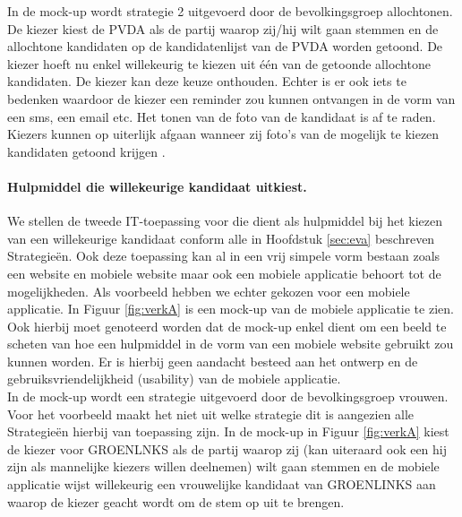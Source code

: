 In de mock-up wordt strategie 2 uitgevoerd door de bevolkingsgroep allochtonen. De kiezer kiest de PVDA als de partij waarop zij/hij wilt gaan stemmen en de allochtone kandidaten op de kandidatenlijst van de PVDA worden getoond. De kiezer hoeft nu enkel willekeurig te kiezen uit één van de getoonde allochtone kandidaten. De kiezer kan deze keuze onthouden. Echter is er ook iets te bedenken waardoor de kiezer een reminder zou kunnen ontvangen in de vorm van een sms, een email etc. Het tonen van de foto van de kandidaat is af te raden. Kiezers kunnen op uiterlijk afgaan wanneer zij foto's van de mogelijk te kiezen kandidaten getoond krijgen \citep{banducci2008ballot,lawson2010looking}. 


\paragraph{Hulpmiddel die willekeurige kandidaat uitkiest.}
We stellen de tweede IT-toepassing voor die dient als hulpmiddel bij het kiezen van een willekeurige kandidaat conform alle in Hoofdstuk \ref{sec:eva} beschreven Strategie\"{e}n. Ook deze toepassing kan al in een vrij simpele vorm bestaan zoals een website en mobiele website maar ook een mobiele applicatie behoort tot de mogelijkheden. Als voorbeeld hebben we echter gekozen voor een mobiele applicatie. In Figuur \ref{fig:verkA} is een mock-up van de mobiele applicatie te zien. Ook hierbij moet genoteerd worden dat de mock-up enkel dient om een beeld te scheten van hoe een hulpmiddel in de vorm van een mobiele website gebruikt zou kunnen worden. Er is hierbij geen aandacht besteed aan het ontwerp en de gebruiksvriendelijkheid (usability) van de mobiele applicatie.\\
\indent In de mock-up wordt een strategie uitgevoerd door de bevolkingsgroep vrouwen. Voor het voorbeeld maakt het niet uit welke strategie dit is aangezien alle Strategie\"{e}n hierbij van toepassing zijn. In de mock-up in Figuur \ref{fig:verkA} kiest de kiezer voor GROENLNKS als de partij waarop zij (kan uiteraard ook een hij zijn als mannelijke kiezers willen deelnemen) wilt gaan stemmen en de mobiele applicatie wijst willekeurig een vrouwelijke kandidaat van GROENLINKS aan waarop de kiezer geacht wordt om de stem op uit te brengen. 


